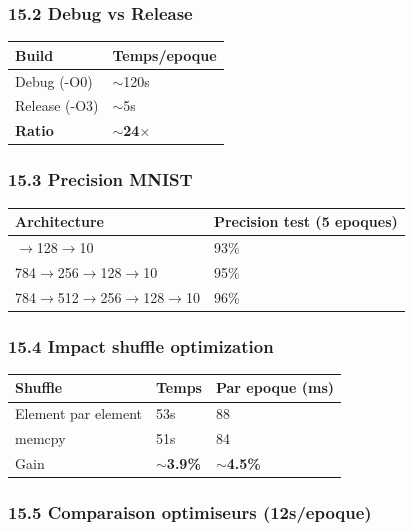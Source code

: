 \documentclass[
  letterpaper,
  DIV=11,
  numbers=noendperiod]{scrartcl}
\newcounter{none} %
\begin{document}
\subsubsection{15.2 Debug vs Release}\label{debug-vs-release}

{\def\LTcaptype{none}
\begin{longtable}[]{@{}ll@{}}
\toprule\noalign{}
Build & Temps/epoque \\
\midrule\noalign{}
\endhead
\bottomrule\noalign{}
\endlastfoot
Debug (-O0) & $\sim$120s \\
Release (-O3) & $\sim$5s \\
\textbf{Ratio} & \textbf{$\sim$24$\times$} \\
\end{longtable}
}

\subsubsection{15.3 Precision MNIST}\label{accuracy-mnist}

{\def\LTcaptype{none}
\begin{longtable}[]{@{}ll@{}}
\toprule\noalign{}
Architecture & Precision test (5 epoques) \\
\midrule\noalign{}
\endhead
\bottomrule\noalign{}
\endlastfoot
784$\to$128$\to$10 & 93\% \\
784$\to$256$\to$128$\to$10 & 95\% \\
784$\to$512$\to$256$\to$128$\to$10 & 96\% \\
\end{longtable}
}

\subsubsection{15.4 Impact shuffle optimization}\label{impact-shuffle}

{\def\LTcaptype{none}
\begin{longtable}[]{@{}lll@{}}
\toprule\noalign{}
Shuffle & Temps & Par epoque (ms) \\
\midrule\noalign{}
\endhead
\bottomrule\noalign{}
\endlastfoot
Element par element & 53s & 88 \\
memcpy & 51s & 84 \\
Gain & \textbf{$\sim$3.9\%} & \textbf{$\sim$4.5\%} \\
\end{longtable}
}

\subsubsection{15.5 Comparaison optimiseurs (12s/epoque)}\label{comparaison-optimiseurs}
\end{document}
